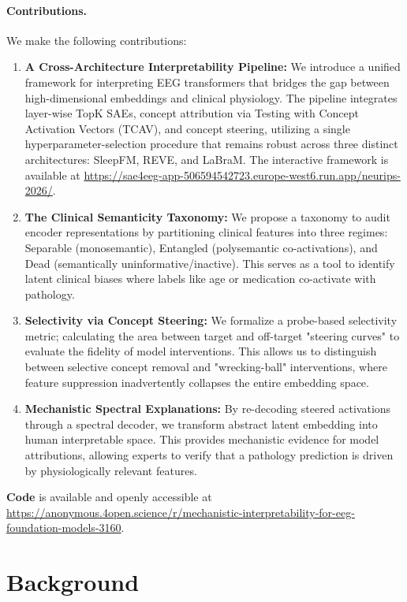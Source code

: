 \documentclass{article}
\begin{document}
\paragraph{Contributions.}
We make the following contributions:
\begin{enumerate}
\item \textbf{A Cross-Architecture Interpretability Pipeline:} We introduce a unified framework for interpreting EEG transformers that bridges the gap between high-dimensional embeddings and clinical physiology. The pipeline integrates layer-wise TopK SAEs, concept attribution via Testing with Concept Activation Vectors (TCAV), and concept steering, utilizing a single hyperparameter-selection procedure that remains robust across three distinct architectures: SleepFM, REVE, and LaBraM. The interactive framework is available at \url{https://sae4eeg-app-506594542723.europe-west6.run.app/neurips-2026/}.

\item \textbf{The Clinical Semanticity Taxonomy:} We propose a taxonomy to audit encoder representations by partitioning clinical features into three regimes: Separable (monosemantic), Entangled (polysemantic co-activations), and Dead (semantically uninformative/inactive). This serves as a tool to identify latent clinical biases where labels like age or medication co-activate with pathology.

\item \textbf{Selectivity via Concept Steering:} We formalize a probe-based selectivity metric; calculating the area between target and off-target "steering curves" to evaluate the fidelity of model interventions. This allows us to distinguish between selective concept removal and "wrecking-ball" interventions, where feature suppression inadvertently collapses the entire embedding space.

\item \textbf{Mechanistic Spectral Explanations:} By re-decoding steered activations through a spectral decoder, we transform abstract latent embedding into human interpretable space. This provides mechanistic evidence for model attributions, allowing experts to verify that a pathology prediction is driven by physiologically relevant features.
\end{enumerate}

\textbf{Code} is available and openly accessible at \url{https://anonymous.4open.science/r/mechanistic-interpretability-for-eeg-foundation-models-3160}.

\section{Background}
\end{document}
